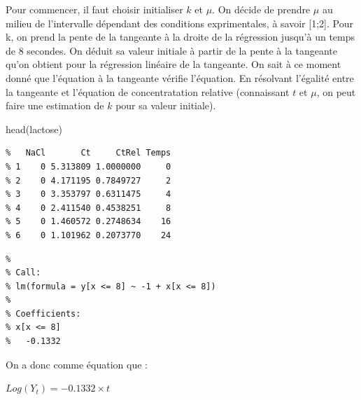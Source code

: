 \documentclass[
]{article}
\newenvironment{Shaded}{\begin{snugshade}}{\end{snugshade}}
\newcommand{\CommentTok}[1]{\textcolor[rgb]{0.56,0.35,0.01}{\textit{#1}}}
\newcommand{\DecValTok}[1]{\textcolor[rgb]{0.00,0.00,0.81}{#1}}
\newcommand{\FunctionTok}[1]{\textcolor[rgb]{0.00,0.00,0.00}{#1}}
\newcommand{\NormalTok}[1]{#1}
\newcommand{\OtherTok}[1]{\textcolor[rgb]{0.56,0.35,0.01}{#1}}
\newcommand{\SpecialCharTok}[1]{\textcolor[rgb]{0.00,0.00,0.00}{#1}}
\begin{document}
Pour commencer, il faut choisir initialiser \(k\) et \(\mu\). On décide
de prendre \(\mu\) au milieu de l'intervalle dépendant des conditions
exprimentales, à savoir {[}1;2{]}. Pour k, on prend la pente de la
tangeante à la droite de la régression jusqu'à un temps de 8 secondes.
On déduit sa valeur initiale à partir de la pente à la tangeante qu'on
obtient pour la régression linéaire de la tangeante. On sait à ce moment
donné que l'équation à la tangeante vérifie l'équation. En résolvant
l'égalité entre la tangeante et l'équation de concentratation relative
(connaissant \(t\) et \(\mu\), on peut faire une estimation de \(k\)
pour sa valeur initiale).

\begin{Shaded}
\begin{Highlighting}[]
\FunctionTok{head}\NormalTok{(lactose)}
\end{Highlighting}
\end{Shaded}

\begin{verbatim}
%   NaCl       Ct     CtRel Temps
% 1    0 5.313809 1.0000000     0
% 2    0 4.171195 0.7849727     2
% 3    0 3.353797 0.6311475     4
% 4    0 2.411540 0.4538251     8
% 5    0 1.460572 0.2748634    16
% 6    0 1.101962 0.2073770    24
\end{verbatim}

\begin{Shaded}
\end{Shaded}

\begin{verbatim}
% 
% Call:
% lm(formula = y[x <= 8] ~ -1 + x[x <= 8])
% 
% Coefficients:
% x[x <= 8]  
%   -0.1332
\end{verbatim}

On a donc comme équation que :

\begin{center}
$Log(Y_t)= -0.1332 \times t$
\end{center}
\end{document}
